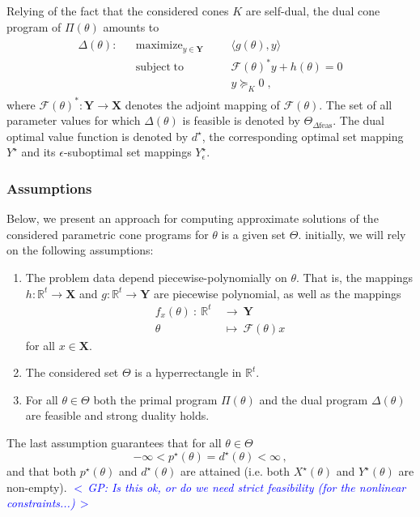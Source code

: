 \documentclass{article}
\newcommand{\R}{\mathbb{R}}        %
\newcommand{\ppar}{\theta}                  %
\newcommand{\Ppar}{\Theta}                  %
\newcommand{\X}{\mathbf{X}}
\newcommand{\Y}{\mathbf{Y}}
\newcommand{\calF}{\mathcal{F}}
\newcommand{\Dfeas}{\Delta \text{feas}}
\DeclareMathOperator*{\maximize}{maximize}
\DeclareMathOperator*{\subj}{subject\;to}
\newcommand{\commentGP}[1]{\noindent \textcolor{blue}{\emph{$<\,$GP: #1$\,>$}}}%
\begin{document}
Relying of the fact that the considered cones $K$ are self-dual, the dual cone program of $\Pi(\ppar)$ amounts to
\begin{gather}\label{eq:parametric_dual}
\begin{aligned}
\Delta(\ppar): && \maximize_{y\in\Y} &&& \langle g(\ppar) , y \rangle\\
               && \subj              &&& \calF(\ppar)^* y + h(\ppar)= 0\\
               &&                    &&& y \succeq_K 0  \;,
\end{aligned}
\end{gather}
where $\calF(\ppar)^*: \Y\rightarrow\X$ denotes the adjoint mapping of $\calF(\ppar)$. The set of all parameter values for which $\Delta(\ppar)$ is feasible is denoted by $\Ppar_{\Dfeas}$. The dual optimal value function is denoted by $d^\star$, the corresponding optimal set mapping $Y^\star$ and its $\epsilon$-suboptimal set mappings $Y^\star_\epsilon$.


\subsubsection*{Assumptions}

Below, we present an approach for computing approximate solutions of the considered parametric cone programs for $\ppar$ is a given set $\Ppar$. initially, we will rely on the following assumptions:
\begin{enumerate}[\bf\text{A}1.]
\item\label{ass_pdep} The problem data depend piecewise-polynomially on $\ppar$. That is, the mappings $h:\R^t\rightarrow\X$ and $g:\R^t\rightarrow\Y$ are piecewise polynomial, as well as the mappings
    \begin{align*}
    f_x(\ppar) ~:~ \R^t~  &\rightarrow~\Y\\
                   \ppar~ &\mapsto~\calF(\ppar)x     
    \end{align*} 
    for all $x\in\X$.
\item\label{ass_Ppar} The considered set $\Ppar$ is a hyperrectangle in $\R^t$. 
\item\label{ass_feas} For all $\ppar\in\Ppar$ both the primal program $\Pi(\ppar)$ and the dual program $\Delta(\ppar)$ are feasible and strong duality holds. 
\end{enumerate}
The last assumption guarantees that for all $\ppar\in\Ppar$
\[ -\infty < p^\star(\ppar) = d^\star(\ppar) < \infty \,,%
\]
and that both $p^\star(\ppar)$ and $d^\star(\ppar)$ are attained (i.e. both $X^\star(\ppar)$ and $Y^\star(\ppar)$ are non-empty). \commentGP{Is this ok, or do we need strict feasibility (for the nonlinear constraints...)}
\end{document}
